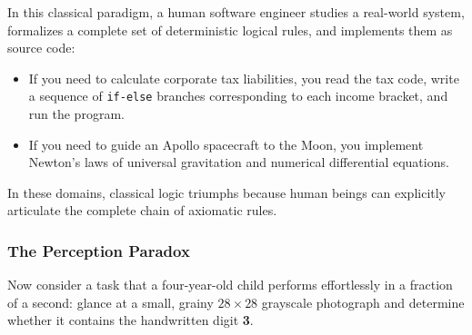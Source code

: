 In this classical paradigm, a human software engineer studies a real-world system, formalizes a complete set of deterministic logical rules, and implements them as source code:
\begin{itemize}
    \item If you need to calculate corporate tax liabilities, you read the tax code, write a sequence of \texttt{if-else} branches corresponding to each income bracket, and run the program.
    \item If you need to guide an Apollo spacecraft to the Moon, you implement Newton's laws of universal gravitation and numerical differential equations.
\end{itemize}
In these domains, classical logic triumphs because human beings can explicitly articulate the complete chain of axiomatic rules.

\subsubsection{The Perception Paradox}
Now consider a task that a four-year-old child performs effortlessly in a fraction of a second: glance at a small, grainy $28 \times 28$ grayscale photograph and determine whether it contains the handwritten digit \textbf{3}.

